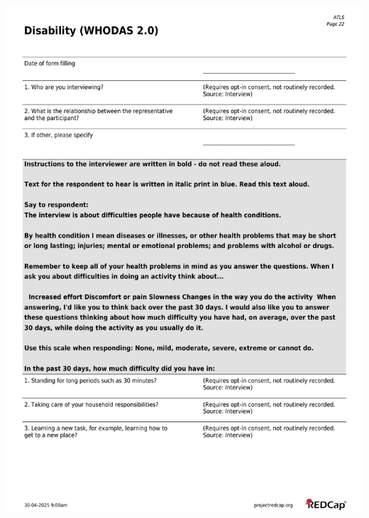\documentclass[
]{scrartcl}
\begin{document}
\includegraphics{../case-record-form/instrument-pdfs/pages/all-instruments-22.pdf}
\end{document}
